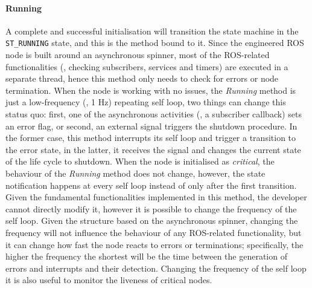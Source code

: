 \paragraph{Running} A complete and successful initialisation will transition the state machine in the \texttt{ST\_RUNNING} state, and this is the method bound to it. Since the engineered ROS node is built around an asynchronous spinner, most of the ROS-related functionalities (\ie, checking subscribers, services and timers) are executed in a separate thread, hence this method only needs to check for errors or node termination. When the node is working with no issues, the \textit{Running} method is just a low-frequency (\ie, 1 Hz) repeating self loop, two things can change this status quo: first, one of the asynchronous activities (\eg, a subscriber callback) sets an error flag, or second, an external signal triggers the shutdown procedure. In the former case, this method interrupts its self loop and trigger a transition to the error state, in the latter, it receives the signal and changes the current state of the life cycle to shutdown. When the node is initialised as \textit{critical}, the behaviour of the \textit{Running} method does not change, however, the state notification happens at every self loop instead of only after the first transition. Given the fundamental functionalities implemented in this method, the developer cannot directly modify it, however it is possible to change the frequency of the self loop. Given the structure based on the asynchronous spinner, changing the frequency will not influence the behaviour of any ROS-related functionality, but it can change how fast the node reacts to errors or terminations; specifically, the higher the frequency the shortest will be the time between the generation of errors and interrupts and their detection. Changing the frequency of the self loop it is also useful to monitor the liveness of critical nodes. 

